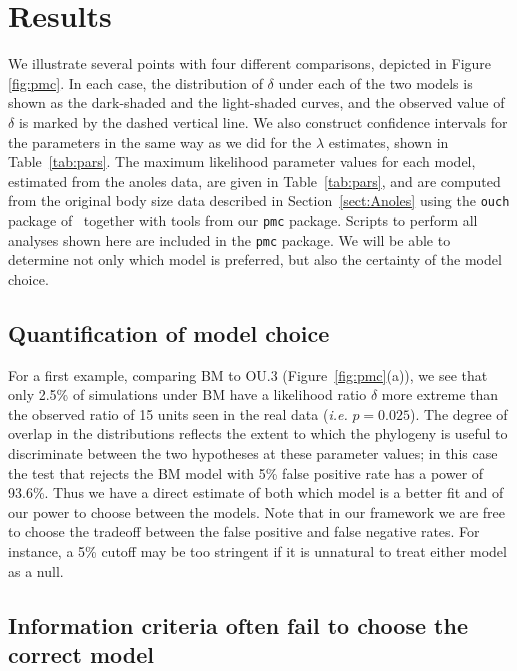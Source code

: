 \section{Results}


We illustrate several points with four different comparisons, depicted in Figure \ref{fig:pmc}.  
In each case, the distribution of $\delta$ under each of the two models is shown as the dark-shaded and the light-shaded curves,
and the observed value of $\delta$ is marked by the dashed vertical line. 
We also construct confidence intervals for the parameters in the same way as we did for the $\lambda$ estimates, shown in Table~\ref{tab:pars}.
The maximum likelihood parameter values for each model, estimated from the anoles data, are given in Table~\ref{tab:pars}, 
and are computed from the original body size data described in Section~\ref{sect:Anoles} using the \texttt{ouch} package of~\citet{Butler2004}
together with tools from our \texttt{pmc} package.  
Scripts to perform all analyses shown here are included in the \texttt{pmc} package.  
We will be able to determine not only which model is preferred, 
but also the certainty of the model choice.


\subsection{Quantification of model choice}

For a first example, comparing BM to OU.3 (Figure~\ref{fig:pmc}(a)),
we see that only 2.5\% of simulations under BM have a likelihood ratio $\delta$ more extreme
than the observed ratio of 15 units seen in the real data (\emph{i.e.} $p=0.025$). 
The degree of overlap in the distributions reflects 
the extent to which the phylogeny is useful to discriminate between the two hypotheses 
at these parameter values;
in this case the test that rejects the BM model with 5\% false positive rate has a power of 93.6\%. 
Thus we have a direct estimate of both which model is a better fit and of our power to choose between the models.  
Note that in our framework we are free to choose the tradeoff between the false positive and false negative rates.  
For instance, a 5\% cutoff may be too stringent if it is unnatural to treat either model as a null.   

\subsection{Information criteria often fail to choose the correct model}

